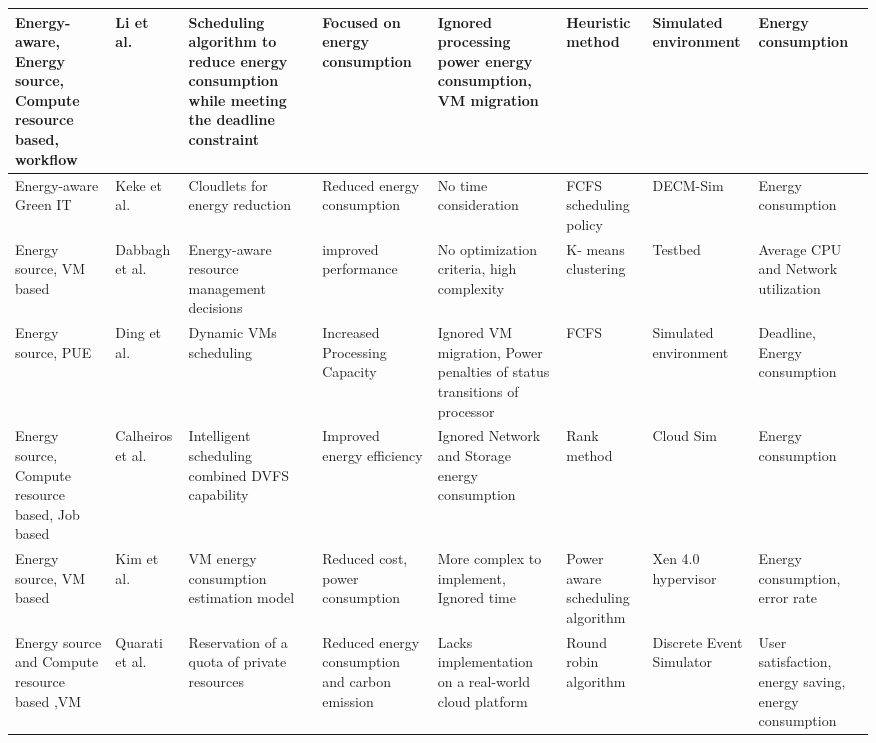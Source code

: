\begin{table*}[!htbp]
{\begin{tabular}{|g{2cm} p{1.5cm} p{2cm} p{2cm} p{2cm} p{2cm} p{2cm} p{2cm}|}
Energy-aware, Energy source, Compute resource based, workflow & Li et al.~\cite{li2016energy} & Scheduling algorithm to reduce energy consumption while meeting the deadline constraint & Focused on energy consumption & Ignored  processing power energy consumption, VM migration & Heuristic method & Simulated environment & Energy consumption 
\\ \hline 

Energy-aware Green IT & Keke et al.~\cite{gai2016dynamic} & Cloudlets for energy reduction & Reduced energy consumption & No time consideration & FCFS scheduling policy & DECM-Sim & Energy consumption 
\\ \hline

 

Energy source, VM based & Dabbagh et al.~\cite{dabbagh2015energy} &  Energy-aware resource management decisions  & improved performance & No optimization criteria, high complexity& K- means clustering& Testbed & Average CPU and Network utilization 
\\ \hline

Energy source, PUE & Ding  et al.~\cite{ding2015energy} & Dynamic VMs scheduling & Increased Processing Capacity & Ignored VM migration, Power penalties of status transitions of processor & FCFS & Simulated environment  & Deadline, Energy consumption 
\\ \hline 

Energy source, Compute resource based, Job based & Calheiros et al.~\cite{calheiros2014energy} & Intelligent scheduling combined DVFS capability  &  Improved energy efficiency  & Ignored Network and Storage energy consumption  &  Rank method   & Cloud Sim & Energy consumption 
\\ \hline 

Energy source, VM based & Kim et al.~\cite{kim2014energy} & VM energy consumption estimation model & Reduced cost, power consumption & More complex to implement, Ignored time & Power aware scheduling algorithm & Xen 4.0 hypervisor & Energy consumption, error rate 
\\ \hline

Energy source and  Compute resource based ,VM  & Quarati et al.~\cite{quarati2013hybrid} &  Reservation of a quota of private resources & Reduced energy consumption and carbon emission & Lacks implementation on a real-world cloud platform & Round robin algorithm & Discrete Event Simulator & User satisfaction, energy saving, energy consumption 
\\ \hline


\end{tabular}}
\end{table*}
